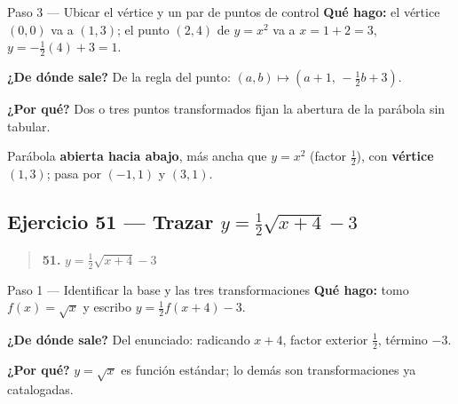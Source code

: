 \documentclass[11pt]{article}
\begin{document}
\begin{paso}{Paso 3 --- Ubicar el vértice y un par de puntos de control}
\textbf{Qué hago:} el vértice $(0,0)$ va a $(1,3)$; el punto $(2,4)$ de $y=x^2$ va a $x=1+2=3$, $y=-\tfrac12(4)+3=1$.

\textbf{¿De dónde sale?} De la regla del punto: $(a,b)\mapsto (a+1,\,-\tfrac12 b+3)$.

\textbf{¿Por qué?} Dos o tres puntos transformados fijan la abertura de la parábola sin tabular.

\begin{center}
\end{center}
\end{paso}

\begin{resp}
Parábola \textbf{abierta hacia abajo}, más ancha que $y=x^2$ (factor $\tfrac12$), con \textbf{vértice $(1,3)$}; pasa por $(-1,1)$ y $(3,1)$.
\end{resp}

\subsection*{Ejercicio 51 — Trazar $y=\tfrac12\sqrt{x+4}-3$}

\begin{quote}
\textbf{51.} $y=\tfrac12\sqrt{x+4}-3$
\end{quote}

\begin{paso}{Paso 1 --- Identificar la base y las tres transformaciones}
\textbf{Qué hago:} tomo $f(x)=\sqrt{x}$ y escribo $y=\tfrac12 f(x+4)-3$.

\textbf{¿De dónde sale?} Del enunciado: radicando $x+4$, factor exterior $\tfrac12$, término $-3$.

\textbf{¿Por qué?} $y=\sqrt{x}$ es función estándar; lo demás son transformaciones ya catalogadas.
\end{paso}
\end{document}
